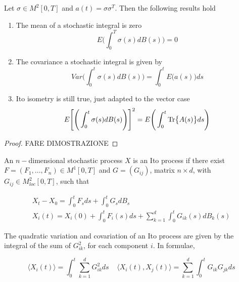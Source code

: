 \begin{proposition}
    Let $\sigma \in M^2[0,T]$ and $a(t) = \sigma \sigma^T$. Then the following results hold

    \begin{enumerate}
        \item The mean of a stochastic integral is zero
        \begin{equation}
            E\Bigg( \int_0^T \sigma(s) dB(s) \Bigg) = 0 
        \end{equation}
        \item The covariance a stochastic integral is given by
        \begin{equation}
            Var\Bigg( \int_0^t \sigma(s) dB(s) \Bigg) = \int_0^t E\big( a(s) \big) ds
        \end{equation}
        \item Ito isometry is still true, just adapted to the vector case
        \begin{equation}
            E\Bigg[ \Bigg( \int_0^t \sigma(s) dB(s) \Bigg) \Bigg]^2 = E\Bigg( \int_0^t \Tr{A(s)} ds \Bigg)
        \end{equation}
    \end{enumerate}
\end{proposition}
\begin{proof}
    FARE DIMOSTRAZIONE
\end{proof}

\begin{definition}
    An $n-$dimensional stochastic process $X$ is an Ito process if there exist $F = (F_1,...,F_n) \in M^1[0,T]$ and $G = (G_{ij})$, matrix $n \times d$, with $G_{ij} \in M^2_{loc}[0,T]$, such that

    \begin{gather*}
        X_t - X_0 = \int_0^t F_s ds + \int_0^t G_s dB_s \\
        X_i(t) = X_i(0) + \int_0^t F_i(s) ds + \sum_{k=1}^d \int_0^t G_{ik}(s) dB_k(s)
    \end{gather*}
\end{definition}

The quadratic variation and covariation of an Ito process are given by the integral of the sum of $G_{ik}^2$, for each component $i$. In formulae, 

\begin{equation}
    \langle X_i(t) \rangle = \int_0^t \sum_{k=1}^d G_{ik}^2 ds \;\;\;\; \langle X_i(t), X_j(t) \rangle = \sum_{k=1}^d \int_0^t G_{ik} G_{jk} ds
\end{equation}

